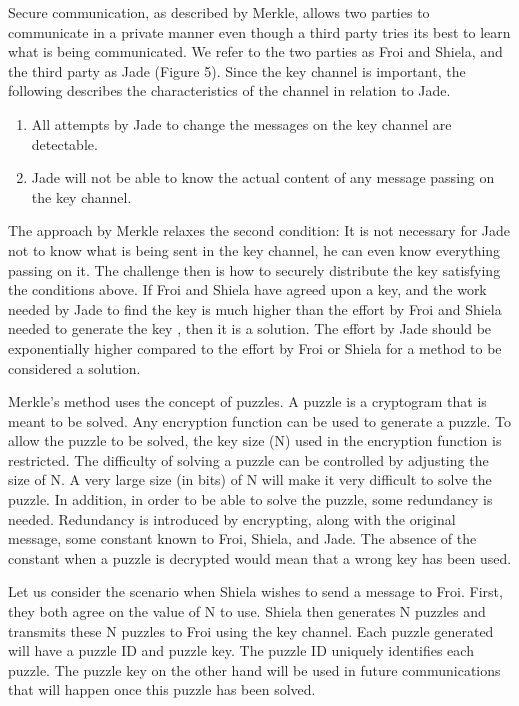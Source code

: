 \documentclass{article}
\begin{document}
Secure communication, as described by Merkle\cite{merkle_secure_1978},
allows two parties to communicate in a private manner even though
a third party tries its best to learn what is being communicated.
We refer to the two parties as Froi and Shiela, and the third party
as Jade (Figure 5). Since the key channel is important, the following
describes the characteristics of the channel in relation to Jade.
\begin{enumerate}
\item All attempts by Jade to change the messages on the key channel are
detectable.
\item Jade will not be able to know the actual content of any message passing
on the key channel.
\end{enumerate}
The approach by Merkle relaxes the second condition: It is not necessary
for Jade not to know what is being sent in the key channel, he can
even know everything passing on it. The challenge then is how to securely
distribute the key satisfying the conditions above. If Froi and Shiela
have agreed upon a key, and the work needed by Jade to find the key
is much higher than the effort by Froi and Shiela needed to generate
the key , then it is a solution. The effort by Jade should be exponentially
higher compared to the effort by Froi or Shiela for a method to be
considered a solution. 

Merkle's method uses the concept of puzzles\cite{merkle_secure_1978}.
A puzzle is a cryptogram that is meant to be solved. Any encryption
function can be used to generate a puzzle. To allow the puzzle to
be solved, the key size (N) used in the encryption function is restricted.
The difficulty of solving a puzzle can be controlled by adjusting
the size of N. A very large size (in bits) of N will make it very
difficult to solve the puzzle. In addition, in order to be able to
solve the puzzle, some redundancy is needed. Redundancy is introduced
by encrypting, along with the original message, some constant known
to Froi, Shiela, and Jade. The absence of the constant when a puzzle
is decrypted would mean that a wrong key has been used. 

Let us consider the scenario when Shiela wishes to send a message
to Froi. First, they both agree on the value of N to use. Shiela then
generates N puzzles and transmits these N puzzles to Froi using the
key channel. Each puzzle generated will have a puzzle ID and puzzle
key. The puzzle ID uniquely identifies each puzzle. The puzzle key
on the other hand will be used in future communications that will
happen once this puzzle has been solved. 
\end{document}
